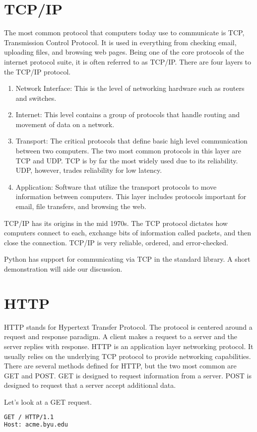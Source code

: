 \section*{TCP/IP}
The most common protocol that computers today use to communicate is TCP, Transmission Control Protocol.
It is used in everything from checking email, uploading files, and browsing web pages.
Being one of the core protocols of the internet protocol suite, it is often referred to as TCP/IP.
There are four layers to the TCP/IP protocol.
\begin{enumerate}
\item Network Interface: This is the level of networking hardware such as routers and switches.
\item Internet: This level contains a group of protocols that handle routing and movement of data on a network.
\item Transport: The critical protocols that define basic high level communication between two computers.
The two most common protocols in this layer are TCP and UDP.  TCP is by far the most widely used due to its reliability.
UDP, however, trades reliability for low latency.
\item Application: Software that utilize the transport protocols to move information between computers.
This layer includes protocols important for email, file transfers, and browsing the web.
\end{enumerate}

TCP/IP has its origins in the mid 1970s.
The TCP protocol dictates how computers connect to each, exchange bits of information called packets, and then close the connection.
TCP/IP is very reliable, ordered, and error-checked.

Python has support for communicating via TCP in the standard library.
A short demonstration will aide our discussion.




\section*{HTTP}
HTTP stands for Hypertext Transfer Protocol.
The protocol is centered around a request and response paradigm.
A client makes a request to a server and the server replies with response.
HTTP is an application layer networking protocol.
It usually relies on the underlying TCP protocol to provide networking capabilities.
There are several methods defined for HTTP, but the two most common are GET and POST.
GET is designed to request information from a server.
POST is designed to request that a server accept additional data.

Let's look at a GET request.
\begin{lstlisting}[language=HTML]
GET / HTTP/1.1
Host: acme.byu.edu
\end{lstlisting}
